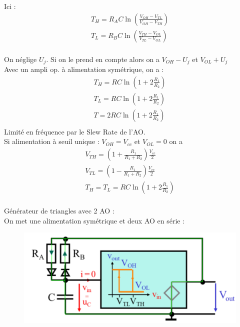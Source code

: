 \documentclass[../main.tex]{subfiles}
\begin{document}
Ici : \begin{equation}
    \begin{gathered}
        T_H = R_AC \ln(\frac{V_{OH}-V_{TL}}{V_{OH}-V_{TH}})\\
        T_L = R_BC \ln(\frac{V_{TH}-V_{OL}}{V_{TL}-V_{OL}})\\
    \end{gathered}
\end{equation}

\warning On néglige $U_j$. Si on le prend en compte alors on a $V_{OH} - U_j$ et $V_{OL}+U_j$\\

Avec un ampli op. à alimentation symétrique, on a : \begin{equation}
    \begin{gathered}
        T_H = RC\ln(1+2\frac{R_1}{R_2})\\
        T_L = RC\ln(1+2\frac{R_1}{R_2})\\
        T = 2RC\ln (1+2\frac{R_1}{R_2})\\
    \end{gathered}
\end{equation}
\warning Limité en fréquence par le Slew Rate de l'AO.\\

Si alimentation à seuil unique : $V_{OH} = V_{cc}$ et $V_{OL} = 0$ on a \begin{equation}
    \begin{gathered}
        V_{TH} = (1+\frac{R_1}{R_1+R_2}) \frac{V_{cc}}{2}\\
        V_{TL} = (1-\frac{R_1}{R_1+R_2}) \frac{V_{cc}}{2}\\
        T_H = T_L = RC\ln(1+2\frac{R_1}{R_2})\\
    \end{gathered}
\end{equation}

Générateur de triangles avec 2 AO : \\
On met une alimentation symétrique et deux AO en série : 

\begin{figure}[hbt!]
    \centering
    \includegraphics[width=.7\textwidth]{IMAGES/elec/IMG_0151.jpeg}
\end{figure}
\end{document}
